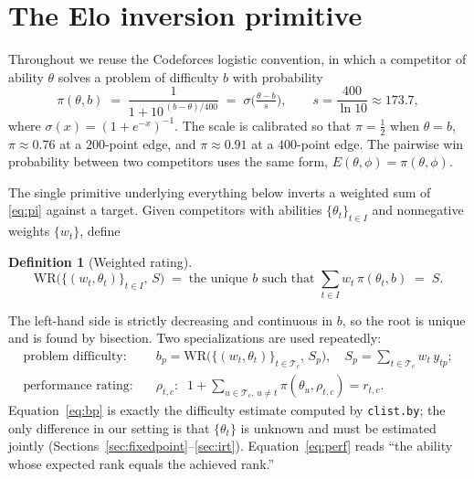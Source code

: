 \documentclass[11pt]{article}
\newcommand{\Teams}{\mathcal{T}}
\theoremstyle{definition}
\newtheorem{definition}{Definition}
\begin{document}
\section{The Elo inversion primitive}\label{sec:elo}

Throughout we reuse the Codeforces logistic convention, in which a competitor of
ability $\theta$ solves a problem of difficulty $b$ with probability
\begin{equation}\label{eq:pi}
  \pi(\theta,b) \;=\; \frac{1}{1 + 10^{\,(b-\theta)/400}}
  \;=\; \sigma\!\Big(\tfrac{\theta - b}{s}\Big),
  \qquad s = \frac{400}{\ln 10} \approx 173.7,
\end{equation}
where $\sigma(x) = (1+e^{-x})^{-1}$. The scale is calibrated so that
$\pi=\tfrac12$ when $\theta=b$, $\pi\approx0.76$ at a $200$-point edge, and
$\pi\approx0.91$ at a $400$-point edge. The pairwise win probability between two
competitors uses the same form, $E(\theta,\phi)=\pi(\theta,\phi)$.

The single primitive underlying everything below inverts a weighted sum of
\eqref{eq:pi} against a target. Given competitors with abilities
$\{\theta_t\}_{t\in I}$ and nonnegative weights $\{w_t\}$, define

\begin{definition}[Weighted rating]\label{def:wr}
\[
  \mathrm{WR}\big(\{(w_t,\theta_t)\}_{t\in I},\, S\big)
  \;=\;
  \text{the unique } b \text{ such that }
  \sum_{t \in I} w_t\, \pi(\theta_t, b) \;=\; S .
\]
\end{definition}

\noindent
The left-hand side is strictly decreasing and continuous in $b$, so the root is
unique and is found by bisection. Two specializations are used repeatedly:
\begin{align}
  \text{problem difficulty:}\quad
    & b_p = \mathrm{WR}\big(\{(w_t,\theta_t)\}_{t\in\Teams_c},\, S_p\big),
      \quad S_p = \sum_{t\in\Teams_c} w_t\, y_{tp};
      \label{eq:bp}\\[2pt]
  \text{performance rating:}\quad
    & \rho_{t,c} : \;\; 1 + \!\!\sum_{u\in\Teams_c,\,u\neq t}\!\! \pi(\theta_u,\rho_{t,c}) = r_{t,c}.
      \label{eq:perf}
\end{align}
Equation~\eqref{eq:bp} is exactly the difficulty estimate computed by
\texttt{clist.by}; the only difference in our setting is that
$\{\theta_t\}$ is unknown and must be estimated jointly
(Sections~\ref{sec:fixedpoint}--\ref{sec:irt}). Equation~\eqref{eq:perf} reads
``the ability whose expected rank equals the achieved rank.''
\end{document}
